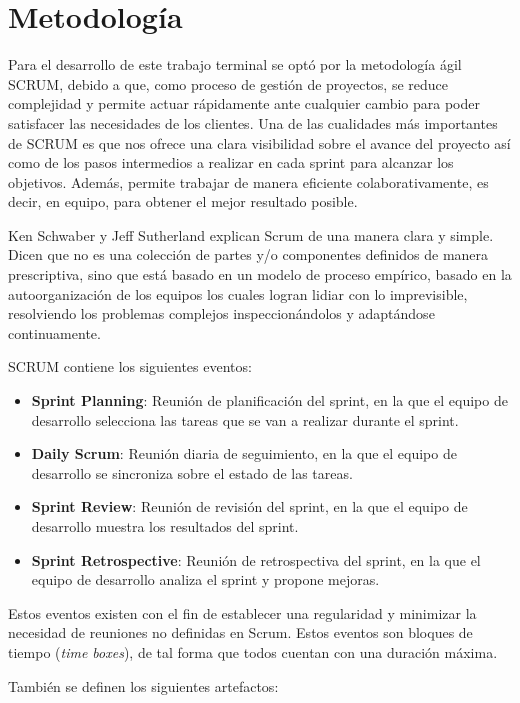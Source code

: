 \section{Metodología}

Para el desarrollo de este trabajo terminal se optó por la metodología ágil SCRUM,
debido a que, como proceso de gestión de proyectos, se reduce complejidad y
permite actuar rápidamente ante cualquier cambio para poder satisfacer las
necesidades de los clientes. Una de las cualidades más importantes de SCRUM
es que nos ofrece una clara visibilidad sobre el avance del proyecto así como de
los pasos intermedios a realizar en cada sprint para alcanzar los objetivos. Además,
permite trabajar de manera eficiente colaborativamente, es decir, en equipo,
para obtener el mejor resultado posible.

Ken Schwaber y Jeff Sutherland \cite{schwaber2016} explican Scrum de una manera clara y simple.
Dicen que no es una colección de partes y/o componentes definidos de manera
prescriptiva, sino que está basado en un modelo de proceso empírico, basado en
la autoorganización de los equipos los cuales logran lidiar con lo imprevisible,
resolviendo los problemas complejos inspeccionándolos y adaptándose continuamente.

SCRUM contiene los siguientes eventos:

\begin{itemize}
  \item \textbf{Sprint Planning}: Reunión de planificación del sprint, en la que
  el equipo de desarrollo selecciona las tareas que se van a realizar durante el
  sprint.
  \item \textbf{Daily Scrum}: Reunión diaria de seguimiento, en la que el equipo
  de desarrollo se sincroniza sobre el estado de las tareas.
  \item \textbf{Sprint Review}: Reunión de revisión del sprint, en la que el
  equipo de desarrollo muestra los resultados del sprint.
  \item \textbf{Sprint Retrospective}: Reunión de retrospectiva del sprint, en
  la que el equipo de desarrollo analiza el sprint y propone mejoras.
\end{itemize}

Estos eventos existen con el fin de establecer una regularidad y minimizar la
necesidad de reuniones no definidas en Scrum. Estos eventos son bloques de
tiempo (\textit{time boxes}), de tal forma que todos cuentan con una duración máxima.

También se definen los siguientes artefactos:

